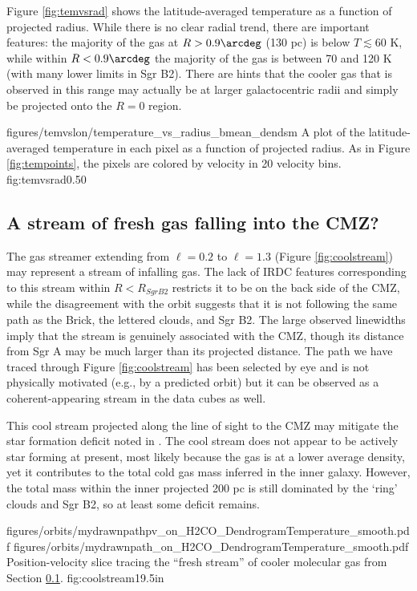 Figure \ref{fig:temvsrad} shows the latitude-averaged temperature as a
function of projected radius.  While there is no clear radial trend, there are
important features: the majority of the gas at $R>0.9\arcdeg$ (130 pc) is below
$T\lesssim 60$ K, while within $R<0.9\arcdeg$ the majority of the gas is
between 70 and 120 K (with many lower limits in Sgr B2).  There are hints that
the cooler gas that is observed in this range may actually be at larger
galactocentric radii and simply be projected onto the $R=0$ region.

\Figure
{figures/temvslon/temperature_vs_radius_bmean_dendsm}
{A plot of the latitude-averaged temperature in each pixel as a function of
projected radius. As in Figure \ref{fig:tempoints}, the pixels are colored by
velocity in 20 \kms velocity bins.}
{fig:temvsrad}{0.5}{0}


\subsection{A stream of fresh gas falling into the CMZ?}
\label{sec:coolstream}
The gas streamer extending from $\ell=0.2$ to $\ell=1.3$ (Figure
\ref{fig:coolstream}) may represent a stream of infalling gas.  The lack of
IRDC features corresponding to this stream within $R<R_{SgrB2}$ restricts it to
be on the back side of the CMZ, while the disagreement with the
\citet{Kruijssen2014d} orbit suggests that it
is not following the same path as the Brick, the lettered clouds, and Sgr B2.
The large observed linewidths imply that the stream is genuinely associated
with the CMZ, though its distance from Sgr A may be much larger than its
projected distance.  The path we have traced through Figure \ref{fig:coolstream}
has been selected by eye and is not physically motivated (e.g., by a predicted orbit)
but it can be observed as a coherent-appearing stream in the \thirteenco data cubes
as well.

This cool stream projected along the line of sight to the CMZ may mitigate the
star formation deficit noted in \citet{Longmore2013b}.  The cool stream does
not appear to be actively star forming at present, most likely because the gas
is at a lower average density, yet it contributes to the total cold gas mass
inferred in the inner galaxy.  However, the total mass within the inner
projected 200 pc is still dominated by the `ring' clouds and Sgr B2, so at
least some deficit remains.


\RotFigureTwoAA
{figures/orbits/mydrawnpathpv_on_H2CO_DendrogramTemperature_smooth.pdf}
{figures/orbits/mydrawnpath_on_H2CO_DendrogramTemperature_smooth.pdf}
{Position-velocity slice tracing the ``fresh stream'' of cooler molecular
gas from Section \ref{sec:coolstream}.}
{fig:coolstream}{1}{9.5in}

